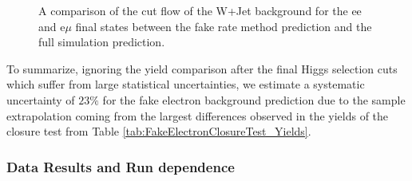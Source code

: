 \begin{figure}[!htbp]
\begin{center}
\caption{A comparison of the cut flow of the W+Jet background for the ee and e$\mu$ final states
between the fake rate method prediction and the full simulation prediction. }
\label{fig:FakeElectronClosureTest_CutFlow}
\end{center}
\end{figure}

To summarize, ignoring the yield comparison after the final Higgs selection cuts which 
suffer from large statistical uncertainties, we estimate a systematic uncertainty of 
$23\%$ for the fake electron background prediction due to the sample extrapolation 
coming from the largest differences observed in the yields of the closure test from 
Table \ref{tab:FakeElectronClosureTest_Yields}. 



\subsubsection{Data Results and Run dependence}
\label{sec:ElectronFakeRateDataResults}

